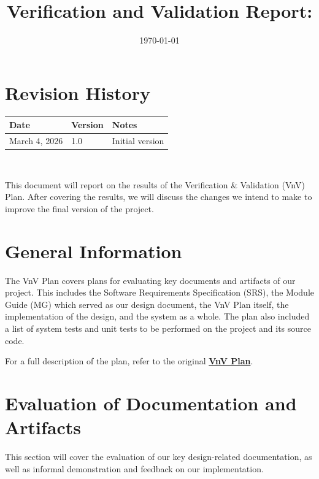 \documentclass[12pt, titlepage]{article}
\begin{document}
\title{Verification and Validation Report: \progname} 
\author{\authname}
\date{\today}
	
\maketitle


\section*{Revision History}

\begin{tabularx}{\textwidth}{p{3cm}p{2cm}X}
\toprule {\bf Date} & {\bf Version} & {\bf Notes}\\
\midrule
March 4, 2026 & 1.0 & Initial version\\
\bottomrule
\end{tabularx}

~\newpage

\tableofcontents

\newpage


This document will report on the results of the Verification \& Validation (VnV) Plan.
After covering the results, we will discuss the changes we intend to make to
improve the final version of the project.

\section{General Information}
The VnV Plan covers plans for evaluating key documents and artifacts of our project.
This includes the Software Requirements Specification (SRS), the Module Guide (MG) which
served as our design document, the VnV Plan itself, the implementation of the design, and
the system as a whole. The plan also included a list of system tests and unit tests to be
performed on the project and its source code.

For a full description of the plan, refer to the original
\href{https://github.com/felix-hurst/Ad-Natura/blob/main/docs/VnVPlan/VnVPlan.pdf}{\bf{VnV Plan}}.

\section{Evaluation of Documentation and Artifacts}
This section will cover the evaluation of our key design-related documentation,
as well as informal demonstration and feedback on our implementation.
\end{document}
